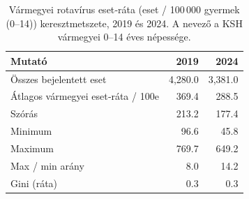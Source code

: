 \begin{table}[htbp]
\centering
\small
\caption{Vármegyei rotavírus eset‑ráta (eset / 100\,000 gyermek (0--14)) keresztmetszete, 2019 és 2024. A nevező a KSH vármegyei 0--14 éves népessége.}
\label{tab:countyxs}
\begin{tabular}{p{6.2cm}rr}
\toprule
Mutató & 2019 & 2024 \\
\midrule
Összes bejelentett eset & 4,280.0 & 3,381.0 \\
Átlagos vármegyei eset‑ráta / 100e & 369.4 & 288.5 \\
Szórás & 213.2 & 177.4 \\
Minimum & 96.6 & 45.8 \\
Maximum & 769.7 & 649.2 \\
Max / min arány & 8.0 & 14.2 \\
Gini (ráta) & 0.3 & 0.3 \\
\bottomrule
\end{tabular}
\end{table}
